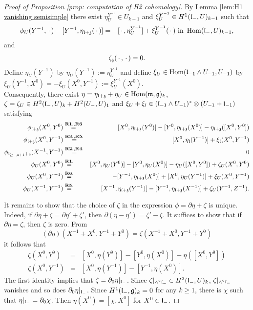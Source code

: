 \documentclass[12pt]{amsart}
\theoremstyle{plain}
\theoremstyle{definition}
\def\Hom{\operatorname{Hom}}
\begin{document}
\begin{proof} [Proof of Proposition \ref{prop: computation of H2 cohomology}]
   By Lemma \ref{lem:H1 vanishing semisimple} %
   there exist    $\eta_U^{Y^{-1}} \in U_{k-1}$ and $\xi_U^{Y^{-1}} \in H^1(\frak l_-, U)_{k-1}$ such that
  $$\phi_U(Y^{-1},\,\cdot\,) - [Y^{-1}, \eta_{\frak l+ \frak z}(\,\cdot\,)] =-[\,\cdot\,, \eta_U^{Y^{-1}}] +\xi_U^{Y^{-1}}(\,\cdot\,) \text{ in } \Hom(\frak l_-, U)_{k-1}, $$
  and $$\zeta_{\frak z} (\,\cdot\,,\,\cdot\,)=0.$$
  Define $\eta_U(Y^{-1})$ by $\eta_U(Y^{-1}):=\eta_U^{Y^{-1}}$ and define $\xi_U \in \Hom (\frak l_{-1} \wedge U_{-1}, U_{-1})$ by $\xi_U(Y^{-1}, X^0)=-\xi_U(X^0, Y^{-1}):=\xi_U^{Y^{-1}}(X^0)$. \\


Consequently, there exist $\eta = \eta_{\frak l+ \frak z} + \eta_U \in \Hom(\frak m, \frak g)_k$, $\zeta =  \zeta_U \in H^2(\frak l_-, U)_k+H^2(U_-, U)_1$ and $\xi_U+ \xi_{\frak l} \in (\frak l_{-1} \wedge U_{-1})^* \otimes (U_{-1}+ \frak l_{-1})$ satisfying
\begin{eqnarray*}
\phi_{\frak l+\frak z}(X^0, Y^0) &\stackrel{{\bf R1.}, {\bf R6}}{=}& [X^0, \eta_{\frak l+\frak z}(Y^0)] -[Y^0,\eta_{\frak l+\frak z}(X^0)] - \eta_{\frak l+\frak z}([X^0,Y^0])\\%
\phi_{\frak l+\frak z}(X^0, Y^{-1})&\stackrel{{\bf R3.},{\bf R5.}}{=}&[X^0, \eta_{\frak l}(Y^{-1})]+\xi_{\frak l}(X^0, Y^{-1}) \\
  \phi_{\frak l_{\geq -\mu+1}+\frak z}(X^{-1},Y^{-1}) &\stackrel{{\bf R2.}, {\bf R4.}}{=}&0 \\
  \phi_U(X^0, Y^0)&\stackrel{\bf R1.}{=}& [X^0, \eta_U(Y^0)] -[Y^0,\eta_U(X^0)] - \eta_U([X^0, Y^0]) + \zeta_U(X^0,Y^0) \\
  \phi_U(X^0, Y^{-1}) &\stackrel{\bf R6.}{=}& -[Y^{-1}, \eta_{\frak l+\frak z}(X^0)] +[X^0, \eta_U(Y^{-1})] +\xi_U (X^0, Y^{-1}) \\
  \phi_U(X^{-1}, Y^{-1}) &\stackrel{\bf R5.}{=}& [X^{-1}, \eta_{\frak l+ \frak z}(Y^{-1})] -[Y^{-1},\eta_{\frak l+\frak z}(X^{-1})]+\zeta_U(Y^{-1}, Z^{-1}).
\end{eqnarray*}
%

  It remains to show that the choice of $\zeta$ in the  expression $\phi = \partial \eta + \zeta   $ is unique. Indeed, if $\partial \eta + \zeta   =\partial \eta' + \zeta'   $, then $\partial(\eta-\eta') = \zeta' - \zeta$. It suffices to show that if $\partial \eta = \zeta$, then   $\zeta$ is zero.
From
$$(\partial \eta)(X^{-1}+ X^0, Y^{-1}+ Y^0) = \zeta(X^{-1}+X^0, Y^{-1}+Y^0)$$
it follows that
\begin{eqnarray*}
\zeta(X^0, Y^0) &=&[X^0, \eta(Y^0)]-[Y^0, \eta(X^0)] -\eta([X^0, Y^0]) \\
\zeta(X^0, Y^{-1})&=& [X^0, \eta(Y^{-1})] - [Y^{-1}, \eta(X^0)].
\end{eqnarray*}
The first identity implies that $\zeta = \partial_0 \eta|_{\frak l_-}$. Since $\zeta|_{\wedge^2 \frak l_-} \in H^2(\frak l_-, U )_k$, $\zeta|_{\wedge^2 \frak l_-}$ vanishes and so does $\partial_0 \eta|_{\frak l_-}$. Since $H^1(\frak l_-, \frak g)_k=0$ for any $k\geq 1$, there is $\chi$ such that $\eta|_{\frak l_-} =\partial_0\chi$. Then $\eta(X^0) =[\chi, X^0]$ for $X^0 \in \frak l_-$.


\end{proof}
\end{document}
